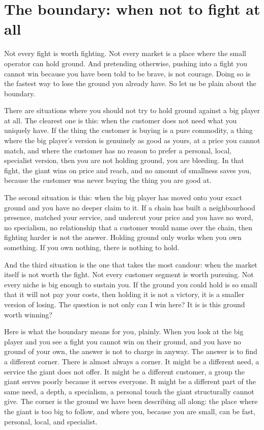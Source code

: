 \documentclass[10pt,twoside,openany]{memoir}
\newcommand{\needspacehead}{\needspace{4\baselineskip}}
\let\oldsection\section
\renewcommand{\section}{\needspacehead\oldsection}
\begin{document}
{\section{The boundary: when not to fight at
all}\label{the-boundary-when-not-to-fight-at-all}

Not every fight is worth fighting. Not every market is a place where the
small operator can hold ground. And pretending otherwise, pushing into a
fight you cannot win because you have been told to be brave, is not
courage. Doing so is the fastest way to lose the ground you already
have. So let us be plain about the boundary.

There are situations where you should not try to hold ground against a
big player at all. The clearest one is this: when the customer does not
need what you uniquely have. If the thing the customer is buying is a
pure commodity, a thing where the big player's version is genuinely as
good as yours, at a price you cannot match, and where the customer has
no reason to prefer a personal, local, specialist version, then you are
not holding ground, you are bleeding. In that fight, the giant wins on
price and reach, and no amount of smallness saves you, because the
customer was never buying the thing you are good at.

The second situation is this: when the big player has moved onto your
exact ground and you have no deeper claim to it. If a chain has built a
neighbourhood presence, matched your service, and undercut your price
and you have no word, no specialism, no relationship that a customer
would name over the chain, then fighting harder is not the answer.
Holding ground only works when you own something. If you own nothing,
there is nothing to hold.

And the third situation is the one that takes the most candour: when the
market itself is not worth the fight. Not every customer segment is
worth pursuing. Not every niche is big enough to sustain you. If the
ground you could hold is so small that it will not pay your costs, then
holding it is not a victory, it is a smaller version of losing. The
question is not only can I win here? It is is this ground worth winning?

Here is what the boundary means for you, plainly. When you look at the
big player and you see a fight you cannot win on their ground, and you
have no ground of your own, the answer is not to charge in anyway. The
answer is to find a different corner. There is almost always a corner.
It might be a different need, a service the giant does not offer. It
might be a different customer, a group the giant serves poorly because
it serves everyone. It might be a different part of the same need, a
depth, a specialism, a personal touch the giant structurally cannot
give. The corner is the ground we have been describing all along: the
place where the giant is too big to follow, and where you, because you
are small, can be fast, personal, local, and specialist.

}
\end{document}
